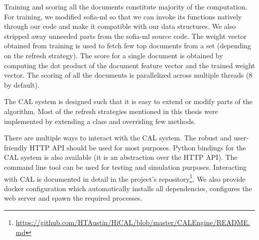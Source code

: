 Training and scoring all the documents constitute majority of the computation.
For training, we modified sofia-ml so that we can invoke its functions natively
through our code and make it compatible with our data structures. We also
stripped away unneeded parts from the sofia-ml source code. The weight vector
obtained from training is used to fetch few top documents from a set (depending
on the refresh strategy). The score for a single document is obtained by
computing the dot product of the document feature vector and the trained
weight vector. The scoring of all the documents is parallelized across multiple
threads (8 by default).

The CAL system is designed such that it is easy to extend or modify parts of the
algorithm. Most of the refresh strategies mentioned in this thesis were
implemented by extending a class and overriding few methods.

There are multiple ways to interact with the CAL system. The robust and user-friendly
HTTP API should be used for most purposes. Python bindings for the CAL system is
also available (it is an abstraction over the HTTP API). The command line tool
can be used for testing and simulation purposes. Interacting with CAL is
documented in detail in the project's
repository\footnote{\url{https://github.com/HTAustin/HiCAL/blob/master/CALEngine/README.md}}.
We also provide docker configuration which automatically installs all
dependencies, configures the web server and spawn the required processes.

